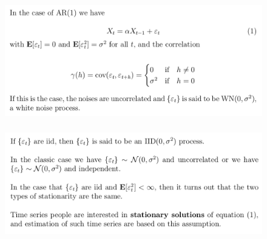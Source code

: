 \documentclass[c, dvipsnames, 8pt]{beamer}
\begin{document}
\begin{frame}[shrink=5]


\frametitle{\insertsection} 
\begin{figure}
	\centering
	\includegraphics[width=1\linewidth]{screenshot007}
	\label{fig:screenshot001}
\end{figure}

\frametitle{\insertsection} 
\begin{figure}
	\centering
	\includegraphics[width=1\linewidth]{screenshot008}
	\label{fig:screenshot001}
\end{figure}





\end{frame}



%
%
%
%
%
%	
%	
%
%
%	
%	
%	
%	
%	
%	
%
%
%
%	
%	
%	
%	
%	
%	
\end{document}
